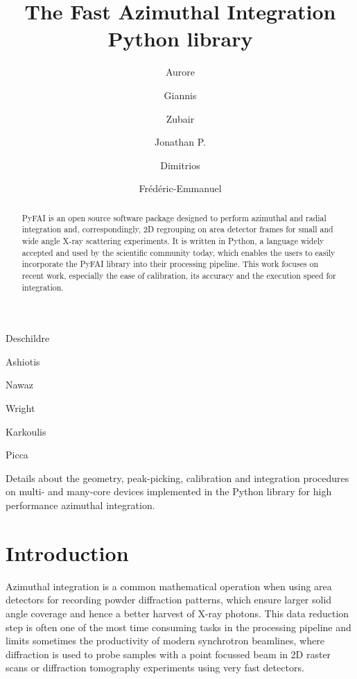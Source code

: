 \documentclass[preprint]{iucr}
\begin{document}
\title{The Fast Azimuthal Integration Python library}

    \author[a]{Aurore}{Deschildre}
    \author[a]{Giannis}{Ashiotis}
    \author[b]{Zubair}{Nawaz}
    \author[a]{Jonathan P.}{Wright}
    \author[a]{Dimitrios}{Karkoulis}
    \author[c]{Fr\'ed\'eric-Emmanuel}{Picca}


\maketitle

\begin{synopsis}
Details about the geometry, peak-picking, calibration and integration procedures
on multi- and many-core devices implemented in the Python library for high
performance azimuthal integration.
\end{synopsis}

\begin{abstract}
PyFAI is an open source software package designed to perform azimuthal and
radial integration and, correspondingly, 2D regrouping on area detector frames for small and wide
angle X-ray scattering experiments.
It is written in Python, a language widely accepted and used by the scientific
community today, which enables the users to easily incorporate the PyFAI
library into their processing pipeline.
This work focuses on recent work, especially the ease of
calibration, its accuracy and the execution speed for integration.
\end{abstract}

\section{Introduction}

Azimuthal integration is a common mathematical operation when using area
detectors for recording powder diffraction patterns, which  ensure larger solid
angle coverage and hence a better harvest of X­-ray photons. 
This data reduction step is often one of the most time ­consuming tasks in the
processing pipeline and limits sometimes the productivity of modern synchrotron
beamlines, where diffraction is used to probe samples with a point focussed
beam in 2D raster scans or diffraction tomography experiments using
very fast detectors.
\end{document}
